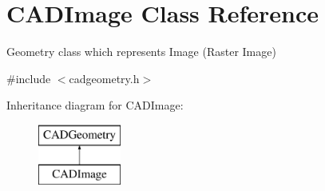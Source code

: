 \hypertarget{class_c_a_d_image}{}\section{C\+A\+D\+Image Class Reference}
\label{class_c_a_d_image}


Geometry class which represents Image (Raster Image)  




{\ttfamily \#include $<$cadgeometry.\+h$>$}

Inheritance diagram for C\+A\+D\+Image\+:\begin{figure}[H]
\begin{center}
\leavevmode
\includegraphics[height=2.000000cm]{class_c_a_d_image}
\end{center}
\end{figure}
